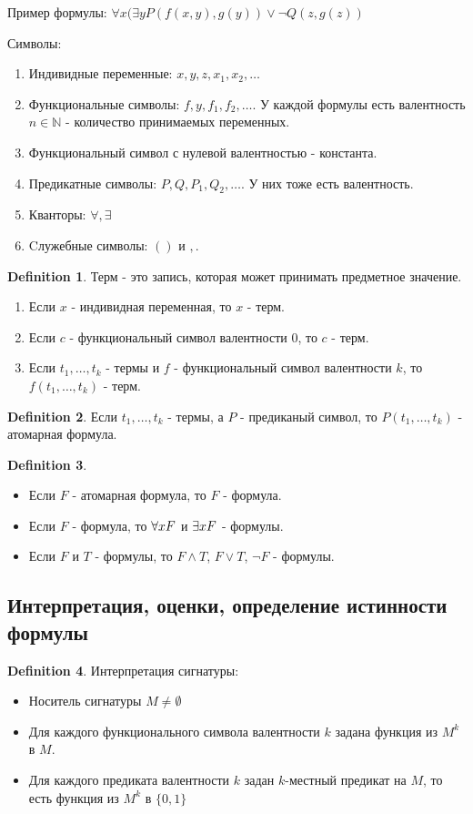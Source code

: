 \documentclass[a4paper]{article}
\theoremstyle{plain}
\theoremstyle{remark}
\theoremstyle{definition}
\newtheorem{definition}{Definition}
\begin{document}
Пример формулы: $\forall{x} (\exists{y} P(f(x,y),g(y))\lor\lnot Q(z,g(z))$

Символы:
\begin{enumerate}
	\item Индивидные переменные: $x,y,z,x_1,x_2,\ldots$
	\item Функциональные символы: $f,y,f_1,f_2, \ldots$. У каждой формулы есть валентность $n \in \mathbb{N}$ - количество принимаемых переменных.
	\item Функциональный символ с нулевой валентностью - константа.
	\item Предикатные символы: $P,Q,P_1,Q_2, \ldots$. У них тоже есть валентность.
	\item Кванторы: $\forall, \exists$
	\item Cлужебные символы: $()$ и $,$.
\end{enumerate}

\begin{definition}
	Терм - это запись, которая может принимать предметное значение.
	\begin{enumerate}
		\item Если $x$ - индивидная переменная, то $x$ - терм.
		\item Если $c$ - функциональный символ валентности $0$, то $c$ - терм.
		\item Если $t_1, \ldots, t_k$ - термы и $f$ - функциональный символ валентности $k$, то $f(t_1, \ldots, t_k)$ - терм.
	\end{enumerate}
\end{definition}

\begin{definition}	
	Если $t_1, \ldots, t_k$ - термы, а $P$ - предиканый символ, то $P(t_1, \ldots, t_k)$ - атомарная формула.
\end{definition}

\begin{definition}
	\forcenewline
	\begin{itemize}
		\item Если $F$ - атомарная формула, то $F$ - формула.
		\item Если $F$ - формула, то $\forall x \space F$ и $\exists x \space F$ - формулы.
		\item Если $F$ и $T$ - формулы, то $F \land T$, $F \lor T$, $\lnot F$ - формулы.
	\end{itemize}
\end{definition}
\subsection{Интерпретация, оценки, определение истинности формулы}
\begin{definition}
	Интерпретация сигнатуры:
	\begin{itemize}
		\item Носитель сигнатуры $M \neq \emptyset$
		\item Для каждого функционального символа валентности $k$ задана функция из $M^k$ в $M$. 
		\item Для каждого предиката валентности $k$ задан $k$-местный предикат на $M$, то есть функция из $M^k$ в $\{0,1\}$
	\end{itemize}
\end{definition}
\end{document}
